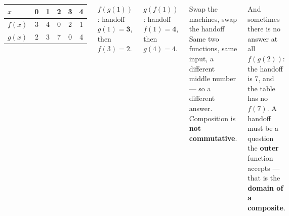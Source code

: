 \documentclass[aspectratio=169, 11pt]{beamer}
\begin{document}
\begin{frame}[t, plain]

  \begin{columns}[T, onlytextwidth]
      \begin{center}
      \renewcommand{\arraystretch}{1.3}
      \begin{tabular}{|l|c|c|c|c|c|}
      \hline
      \(x\) & 0 & 1 & 2 & 3 & 4 \\
      \hline
      \(f(x)\) & 3 & 4 & 0 & 2 & 1 \\
      \hline
      \(g(x)\) & 2 & 3 & 7 & 0 & 4 \\
      \hline
      \end{tabular}
      \end{center}

      \medskip
      \(f(g(1))\): handoff \(g(1) = \mathbf{3}\), then \(f(3) = 2\).

      \smallskip
      \(g(f(1))\): handoff \(f(1) = \mathbf{4}\), then \(g(4) = 4\).

      \begin{block}{Swap the machines, swap the handoff}
        Same two functions, same input, a different middle number --- so a different
        answer. Composition is \textbf{not commutative}.
      \end{block}

      \medskip
      \begin{block}{And sometimes there is no answer at all}
        \(f(g(2))\): the handoff is \(7\), and the table has no \(f(7)\). A handoff must be a
        question the \textbf{outer} function accepts --- that is the \textbf{domain of a
        composite}.
      \end{block}
  \end{columns}
\end{frame}
\end{document}
